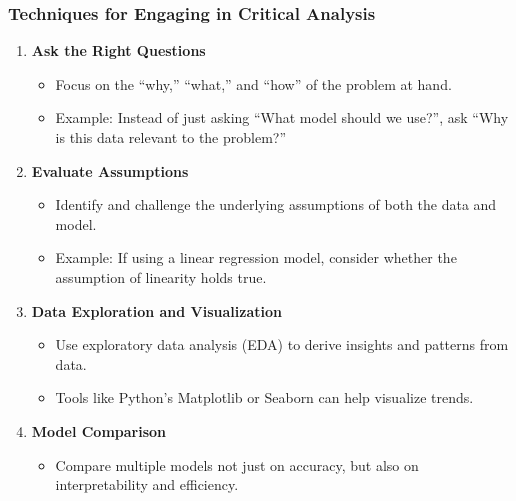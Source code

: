 \documentclass[aspectratio=169]{beamer}
\begin{document}
\begin{frame}[fragile]
    \frametitle{Techniques for Engaging in Critical Analysis}
    \begin{enumerate}
        \item \textbf{Ask the Right Questions}
            \begin{itemize}
                \item Focus on the ``why,'' ``what,'' and ``how'' of the problem at hand.
                \item Example: Instead of just asking ``What model should we use?'', ask ``Why is this data relevant to the problem?'' 
            \end{itemize}
        \item \textbf{Evaluate Assumptions}
            \begin{itemize}
                \item Identify and challenge the underlying assumptions of both the data and model.
                \item Example: If using a linear regression model, consider whether the assumption of linearity holds true.
            \end{itemize}
        \item \textbf{Data Exploration and Visualization}
            \begin{itemize}
                \item Use exploratory data analysis (EDA) to derive insights and patterns from data.
                \item Tools like Python's Matplotlib or Seaborn can help visualize trends.
            \end{itemize}
        \item \textbf{Model Comparison}
            \begin{itemize}
                \item Compare multiple models not just on accuracy, but also on interpretability and efficiency.
            \end{itemize}
    \end{enumerate}
\end{frame}
\end{document}

